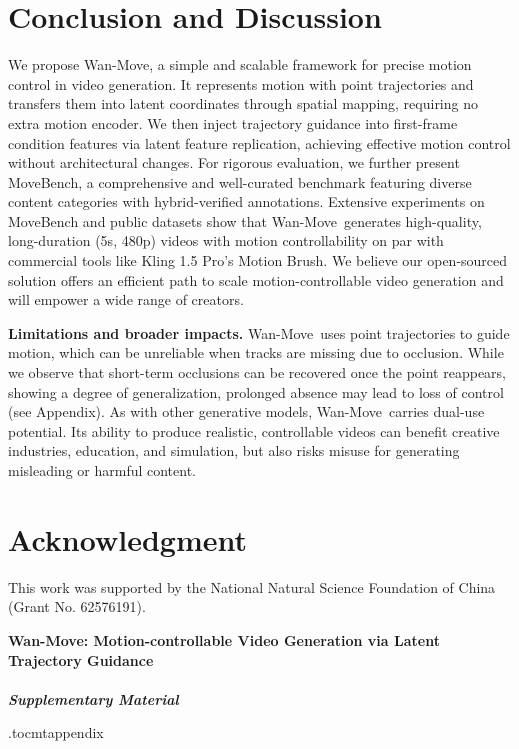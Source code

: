 \documentclass{article}
\newcommand{\method}{Wan-Move}
\begin{document}
\section{Conclusion and Discussion}
We propose \method, a simple and scalable framework for precise motion control in video generation.
It represents motion with point trajectories and transfers them into latent coordinates through spatial mapping, requiring no extra motion encoder. We then inject trajectory guidance into first-frame condition features via latent feature replication, achieving effective motion control without architectural changes. For rigorous evaluation, we further present MoveBench, a comprehensive and well-curated benchmark featuring diverse content categories with hybrid-verified annotations.
Extensive experiments on MoveBench and public datasets show that \method~generates high-quality, long-duration (5s, 480p) videos with motion controllability on par with commercial tools like Kling 1.5 Pro’s Motion Brush.
We believe our open-sourced solution offers an efficient path to scale motion-controllable video generation and will empower a wide range of creators.

\noindent \textbf{Limitations and broader impacts.}
\method~uses point trajectories to guide motion, which can be unreliable when tracks are missing due to occlusion.
While we observe that short-term occlusions can be recovered once the point reappears, showing a degree of generalization, prolonged absence may lead to loss of control (see Appendix).
As with other generative models, \method~carries dual-use potential. Its ability to produce realistic, controllable videos can benefit creative industries, education, and simulation, but also risks misuse for generating misleading or harmful content. 

\section{Acknowledgment}

This work was supported by the National Natural Science Foundation of China (Grant No. 62576191).

\newpage

\begin{center}
 \LARGE \bf {Wan-Move: Motion-controllable Video Generation via Latent Trajectory Guidance\ \\ \ \\ \textit{Supplementary Material}}
\end{center}
\etocdepthtag.toc{mtappendix}
\tableofcontents
\end{document}
